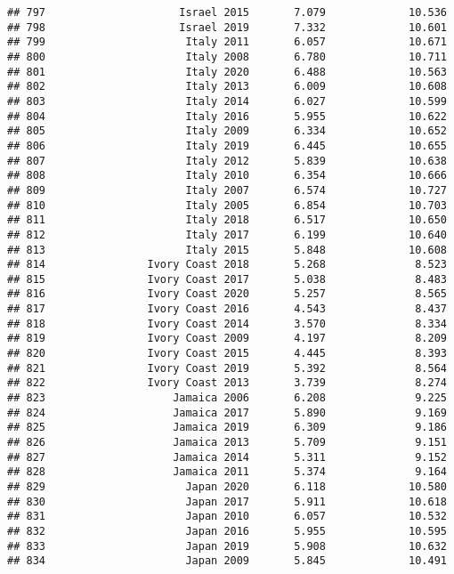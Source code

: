 \documentclass[
]{article}
\begin{document}
\begin{verbatim}
## 797                     Israel 2015       7.079             10.536
## 798                     Israel 2019       7.332             10.601
## 799                      Italy 2011       6.057             10.671
## 800                      Italy 2008       6.780             10.711
## 801                      Italy 2020       6.488             10.563
## 802                      Italy 2013       6.009             10.608
## 803                      Italy 2014       6.027             10.599
## 804                      Italy 2016       5.955             10.622
## 805                      Italy 2009       6.334             10.652
## 806                      Italy 2019       6.445             10.655
## 807                      Italy 2012       5.839             10.638
## 808                      Italy 2010       6.354             10.666
## 809                      Italy 2007       6.574             10.727
## 810                      Italy 2005       6.854             10.703
## 811                      Italy 2018       6.517             10.650
## 812                      Italy 2017       6.199             10.640
## 813                      Italy 2015       5.848             10.608
## 814                Ivory Coast 2018       5.268              8.523
## 815                Ivory Coast 2017       5.038              8.483
## 816                Ivory Coast 2020       5.257              8.565
## 817                Ivory Coast 2016       4.543              8.437
## 818                Ivory Coast 2014       3.570              8.334
## 819                Ivory Coast 2009       4.197              8.209
## 820                Ivory Coast 2015       4.445              8.393
## 821                Ivory Coast 2019       5.392              8.564
## 822                Ivory Coast 2013       3.739              8.274
## 823                    Jamaica 2006       6.208              9.225
## 824                    Jamaica 2017       5.890              9.169
## 825                    Jamaica 2019       6.309              9.186
## 826                    Jamaica 2013       5.709              9.151
## 827                    Jamaica 2014       5.311              9.152
## 828                    Jamaica 2011       5.374              9.164
## 829                      Japan 2020       6.118             10.580
## 830                      Japan 2017       5.911             10.618
## 831                      Japan 2010       6.057             10.532
## 832                      Japan 2016       5.955             10.595
## 833                      Japan 2019       5.908             10.632
## 834                      Japan 2009       5.845             10.491

\end{verbatim}
\end{document}
